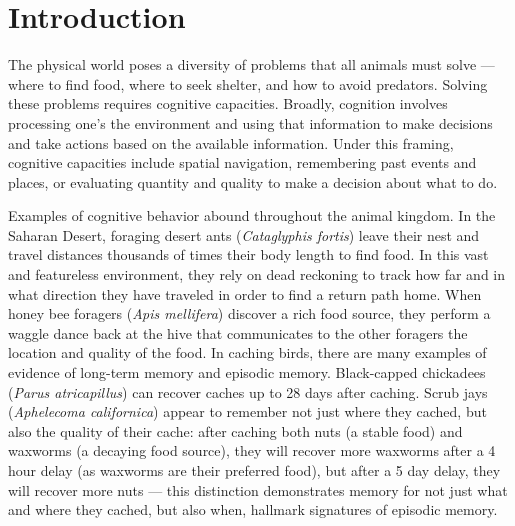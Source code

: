 \chapter{Introduction}
\label{introduction}


The physical world poses a diversity of problems that all animals must solve --- where to find food, where to seek shelter, and how to avoid predators. Solving these problems requires cognitive capacities. Broadly, cognition involves processing one's the environment and using that information to make decisions and take actions based on the available information. Under this framing, cognitive capacities include spatial navigation, remembering past events and places, or evaluating quantity and quality to make a decision about what to do.  

Examples of cognitive behavior abound throughout the animal kingdom. In the Saharan Desert, foraging desert ants (\textit{Cataglyphis fortis}) leave their nest and travel distances thousands of times their body length to find food. In this vast and featureless environment, they rely on dead reckoning to track how far and in what direction they have traveled in order to find a return path home\cite{Muller1988, Wehner2003}. When honey bee foragers (\textit{Apis mellifera}) discover a rich food source, they perform a waggle dance back at the hive that communicates to the other foragers the location and quality of the food\cite{vonFrisch1974, Dyer2002}. In caching birds, there are many examples of evidence of long-term memory and episodic memory. Black-capped chickadees (\textit{Parus atricapillus}) can recover caches up to 28 days after caching\cite{Hitchcock1990}. Scrub jays (\textit{Aphelecoma californica}) appear to remember not just where they cached, but also the quality of their cache: after caching both nuts (a stable food) and waxworms (a decaying food source), they will recover more waxworms after a 4 hour delay (as waxworms are their preferred food), but after a 5 day delay, they will recover more nuts\cite{Clayton1998} --- this distinction demonstrates memory for not just what and where they cached, but also when, hallmark signatures of episodic memory.

